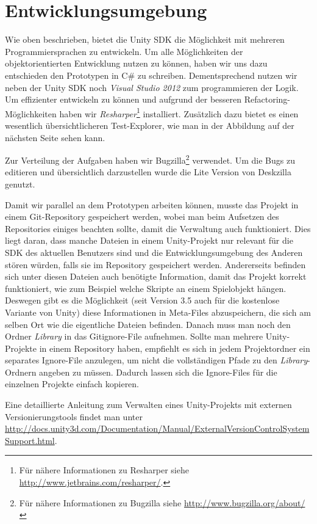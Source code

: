 \section{Entwicklungsumgebung}

Wie oben beschrieben, bietet die Unity SDK die Möglichkeit mit mehreren Programmiersprachen zu entwickeln. Um alle Möglichkeiten der objektorientierten Entwicklung nutzen zu können, haben wir uns dazu entschieden den Prototypen in C\# zu schreiben. Dementsprechend nutzen wir neben der Unity SDK noch \textit{Visual Studio 2012} zum programmieren der Logik. Um effizienter entwickeln zu können und aufgrund der besseren Refactoring-Möglichkeiten haben wir \textit{Resharper}\footnote{Für nähere Informationen zu Resharper siehe \url{http://www.jetbrains.com/resharper/}.} installiert. Zusätzlich dazu bietet es einen wesentlich übersichtlicheren Test-Explorer, wie man in der Abbildung auf der nächsten Seite sehen kann.

Zur Verteilung der Aufgaben haben wir Bugzilla\footnote{Für nähere Informationen zu Bugzilla siehe \url{http://www.bugzilla.org/about/}} verwendet. Um die Bugs zu editieren und übersichtlich darzustellen wurde die Lite Version von Deskzilla genutzt.

Damit wir parallel an dem Prototypen arbeiten können, musste das Projekt in einem Git-Repository gespeichert werden, wobei man beim Aufsetzen des Repositories einiges beachten sollte, damit die Verwaltung auch funktioniert. Dies liegt daran, dass manche Dateien in einem Unity-Projekt nur relevant für die SDK des aktuellen Benutzers sind und die Entwicklungsumgebung des Anderen stören würden, falls sie im Repository gespeichert werden. Andererseits befinden sich unter diesen Dateien auch benötigte Information, damit das Projekt korrekt funktioniert, wie zum Beispiel welche Skripte an einem Spielobjekt hängen. Deswegen gibt es die Möglichkeit (seit Version 3.5 auch für die kostenlose Variante von Unity) diese Informationen in Meta-Files abzuspeichern, die sich am selben Ort wie die eigentliche Dateien befinden. Danach muss man noch den Ordner \textit{Library} in das Gitignore-File aufnehmen. Sollte man mehrere Unity-Projekte in einem Repository haben, empfiehlt es sich in jedem Projektordner ein separates Ignore-File anzulegen, um nicht die vollständigen Pfade zu den \textit{Library}-Ordnern angeben zu müssen. Dadurch lassen sich die Ignore-Files für die einzelnen Projekte einfach kopieren.

Eine detaillierte Anleitung zum Verwalten eines Unity-Projekts mit externen Versionierungstools findet man unter \url{http://docs.unity3d.com/Documentation/Manual/ExternalVersionControlSystemSupport.html}.


